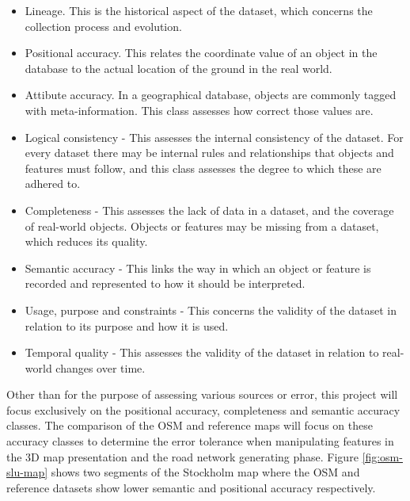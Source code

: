 \documentclass{kththesis}
\begin{document}
\begin{itemize}
  \item Lineage. This is the historical aspect of the dataset, which concerns the collection process and evolution.
  \item Positional accuracy. This relates the coordinate value of an object in the database to the actual location of the ground in the real world.
  \item Attibute accuracy. In a geographical database, objects are commonly tagged with meta-information. This class assesses how correct those values are.
  \item Logical consistency - This assesses the internal consistency of the dataset. For every dataset there may be internal rules and relationships that objects and features must follow, and this class assesses the degree to which these are adhered to.
  \item Completeness - This assesses the lack of data in a dataset, and the coverage of real-world objects. Objects or features may be missing from a dataset, which reduces its quality.
  \item Semantic accuracy - This links the way in which an object or feature is recorded and represented to how it should be interpreted.
  \item Usage, purpose and constraints - This concerns the validity of the dataset in relation to its purpose and how it is used.
  \item Temporal quality - This assesses the validity of the dataset in relation to real-world changes over time.
\end{itemize}

Other than for the purpose of assessing various sources or error, this project will focus exclusively on the positional accuracy, completeness and semantic accuracy classes.
The comparison of the OSM and reference maps will focus on these accuracy classes to determine the error tolerance when manipulating features in the 3D map presentation and the road network generating phase.
Figure \ref{fig:osm-slu-map} shows two segments of the Stockholm map where the OSM and reference datasets show lower semantic and positional accuracy respectively.
\end{document}
